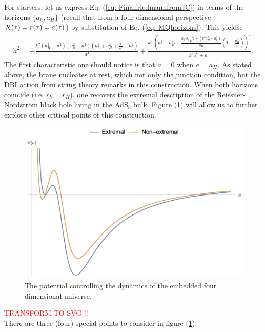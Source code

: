 For starters, let us express Eq. (\ref{eq: FinalfriedmannfromJC}) in terms of the horizons $\{a_{h}, a_{H}\}$ (recall that from a four dimensional perspective $\mathcal{R}(\tau) = r(\tau) = a(\tau)$) by substitution of Eq. (\ref{eq: MQhorizons}). This yields:
\begin{equation}\label{eq: potential_extremal_subs}
\begin{split}
    \dot{a}^{2} = -\frac{k^{2} (a_H^2 - a^2) (a_h^2 - a^2) \left(a_h^2 + a_H^2 + \tfrac{1}{k^2} + a^2\right)}{a^4} +\frac{k^{2}\:\left(a^4-a_{H}^{4}+ \frac{a_{h}\: J_{c}\sqrt{1+ \left(k^2 a_{H}^2 + a_{h}^{2}\right)}}{a_{H}} \left(1-\frac{a_{H}^2}{a^2}\right)\right)^2}{k^{2} J_{c}^2+a^6}.
\end{split}
\end{equation}
The first characteristic one should notice is that $\dot{a} = 0$ when $a = a_{H}$. As stated above, the brane nucleates at rest, which not only the junction condition, but the DBI action from string theory remarks in this construction. When both horizons coincide (i.e. $r_{h}= r_{H}$), one recovers the extremal description of the Reissner-Nordström black hole living in the $\text{AdS}_{5}$ bulk. Figure (\ref{fig: full_potential}) will allow us to further explore other critical points of this construction.
\begin{figure}[h!]
    \centering
    \includegraphics[width=12cm]{Figures/db_pot.png}
    \caption{The potential controlling the dynamics of the embedded four dimensional universe.}
    \label{fig: full_potential}
\end{figure}
\textcolor{red}{TRANSFORM TO SVG !!}\\
There are three (four) special points to consider in figure (\ref{fig: full_potential}):
